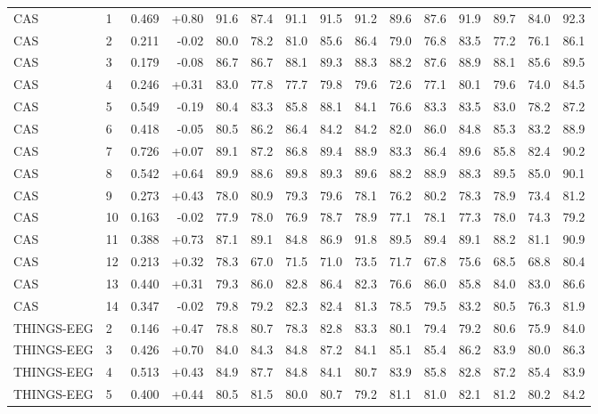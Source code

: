 \begin{longtable}{@{}llrrrrrrrrrrrrr@{}}
CAS & 1 & 0.469 & +0.80 & 91.6 & 87.4 & 91.1 & 91.5 & 91.2 & 89.6 & 87.6 & 91.9 & 89.7 & 84.0 & 92.3 \\
CAS & 2 & 0.211 & -0.02 & 80.0 & 78.2 & 81.0 & 85.6 & 86.4 & 79.0 & 76.8 & 83.5 & 77.2 & 76.1 & 86.1 \\
CAS & 3 & 0.179 & -0.08 & 86.7 & 86.7 & 88.1 & 89.3 & 88.3 & 88.2 & 87.6 & 88.9 & 88.1 & 85.6 & 89.5 \\
CAS & 4 & 0.246 & +0.31 & 83.0 & 77.8 & 77.7 & 79.8 & 79.6 & 72.6 & 77.1 & 80.1 & 79.6 & 74.0 & 84.5 \\
CAS & 5 & 0.549 & -0.19 & 80.4 & 83.3 & 85.8 & 88.1 & 84.1 & 76.6 & 83.3 & 83.5 & 83.0 & 78.2 & 87.2 \\
CAS & 6 & 0.418 & -0.05 & 80.5 & 86.2 & 86.4 & 84.2 & 84.2 & 82.0 & 86.0 & 84.8 & 85.3 & 83.2 & 88.9 \\
CAS & 7 & 0.726 & +0.07 & 89.1 & 87.2 & 86.8 & 89.4 & 88.9 & 83.3 & 86.4 & 89.6 & 85.8 & 82.4 & 90.2 \\
CAS & 8 & 0.542 & +0.64 & 89.9 & 88.6 & 89.8 & 89.3 & 89.6 & 88.2 & 88.9 & 88.3 & 89.5 & 85.0 & 90.1 \\
CAS & 9 & 0.273 & +0.43 & 78.0 & 80.9 & 79.3 & 79.6 & 78.1 & 76.2 & 80.2 & 78.3 & 78.9 & 73.4 & 81.2 \\
CAS & 10 & 0.163 & -0.02 & 77.9 & 78.0 & 76.9 & 78.7 & 78.9 & 77.1 & 78.1 & 77.3 & 78.0 & 74.3 & 79.2 \\
CAS & 11 & 0.388 & +0.73 & 87.1 & 89.1 & 84.8 & 86.9 & 91.8 & 89.5 & 89.4 & 89.1 & 88.2 & 81.1 & 90.9 \\
CAS & 12 & 0.213 & +0.32 & 78.3 & 67.0 & 71.5 & 71.0 & 73.5 & 71.7 & 67.8 & 75.6 & 68.5 & 68.8 & 80.4 \\
CAS & 13 & 0.440 & +0.31 & 79.3 & 86.0 & 82.8 & 86.4 & 82.3 & 76.6 & 86.0 & 85.8 & 84.0 & 83.0 & 86.6 \\
CAS & 14 & 0.347 & -0.02 & 79.8 & 79.2 & 82.3 & 82.4 & 81.3 & 78.5 & 79.5 & 83.2 & 80.5 & 76.3 & 81.9 \\
THINGS-EEG & 2 & 0.146 & +0.47 & 78.8 & 80.7 & 78.3 & 82.8 & 83.3 & 80.1 & 79.4 & 79.2 & 80.6 & 75.9 & 84.0 \\
THINGS-EEG & 3 & 0.426 & +0.70 & 84.0 & 84.3 & 84.8 & 87.2 & 84.1 & 85.1 & 85.4 & 86.2 & 83.9 & 80.0 & 86.3 \\
THINGS-EEG & 4 & 0.513 & +0.43 & 84.9 & 87.7 & 84.8 & 84.1 & 80.7 & 83.9 & 85.8 & 82.8 & 87.2 & 85.4 & 83.9 \\
THINGS-EEG & 5 & 0.400 & +0.44 & 80.5 & 81.5 & 80.0 & 80.7 & 79.2 & 81.1 & 81.0 & 82.1 & 81.2 & 80.2 & 84.2 \\

\end{longtable}
